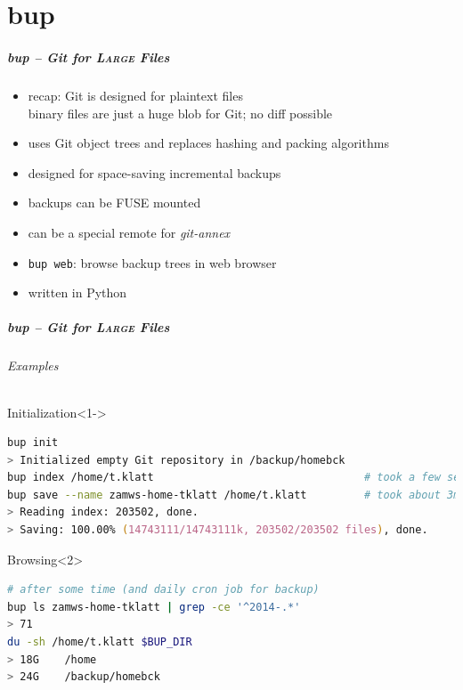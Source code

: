 \documentclass[english,hyperref={pdfpagelabels=false},aspectratio=169]{beamer}
\begin{document}
\part{bup}
\makepart

\begin{frame}[label=bup]
  \frametitle{bup -- Git for \textsc{Large} Files}
  \begin{itemize}
    \item recap: Git is designed for plaintext files\\
      {\scriptsize binary files are just a huge blob for Git; no diff possible}
    \item uses Git object trees and replaces hashing and packing algorithms
    \item designed for space-saving incremental backups
    \item backups can be FUSE mounted
    \item can be a special remote for \textit{git-annex}
    \item \texttt{bup web}: browse backup trees in web browser
    \item written in Python
  \end{itemize}
\end{frame}

\begin{frame}[fragile]
  \frametitle{bup -- Git for \textsc{Large} Files}
  \framesubtitle{Examples}
  \begin{block}{Initialization}<1->
    \vspace{-0.75em}
    \begin{lstlisting}[language=zsh]
bup init
> Initialized empty Git repository in /backup/homebck
bup index /home/t.klatt                                 # took a few seconds
bup save --name zamws-home-tklatt /home/t.klatt         # took about 3min
> Reading index: 203502, done.
> Saving: 100.00% (14743111/14743111k, 203502/203502 files), done.
    \end{lstlisting}
    \vspace{-0.75em}
  \end{block}
  \begin{block}{Browsing}<2>
    \vspace{-0.75em}
    \begin{lstlisting}[language=zsh]
# after some time (and daily cron job for backup)
bup ls zamws-home-tklatt | grep -ce '^2014-.*'
> 71
du -sh /home/t.klatt $BUP_DIR
> 18G    /home
> 24G    /backup/homebck
    \end{lstlisting}
    \vspace{-0.75em}
  \end{block}
\end{frame}
\end{document}
